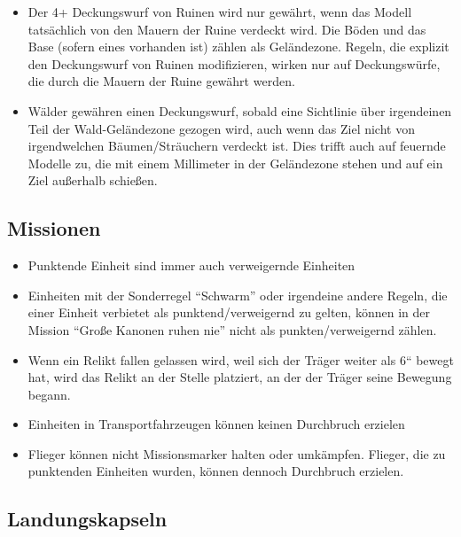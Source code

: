 \begin{itemize}

 \item Der 4+ Deckungswurf von Ruinen wird nur gewährt, wenn das Modell
  tatsächlich von den Mauern der Ruine verdeckt wird. Die Böden und das Base
  (sofern eines vorhanden ist) zählen als Geländezone.
Regeln, die explizit den Deckungswurf von Ruinen modifizieren, wirken nur auf
Deckungswürfe, die durch die Mauern der Ruine gewährt werden.

\item Wälder gewähren einen Deckungswurf, sobald eine Sichtlinie über
 irgendeinen Teil der Wald-Geländezone gezogen wird, auch wenn das Ziel nicht
 von irgendwelchen Bäumen/Sträuchern verdeckt ist.
Dies trifft auch auf feuernde Modelle zu, die mit einem Millimeter in der
Geländezone stehen und auf ein Ziel außerhalb schießen.

\end{itemize}

\subsection{Missionen}

\begin{itemize}

 \item Punktende Einheit sind immer auch verweigernde Einheiten

 \item Einheiten mit der Sonderregel ``Schwarm'' oder irgendeine andere Regeln,
  die einer Einheit  verbietet als punktend/verweigernd zu gelten, können in der
  Mission ``Große Kanonen ruhen nie'' nicht als punkten/verweigernd zählen.

 \item Wenn ein Relikt fallen gelassen wird, weil sich der Träger weiter als 6“
  bewegt hat, wird das Relikt an der Stelle platziert, an der der Träger seine
  Bewegung begann.

 \item Einheiten in Transportfahrzeugen können keinen Durchbruch erzielen

 \item Flieger können nicht Missionsmarker halten oder umkämpfen. Flieger, die
  zu punktenden Einheiten wurden, können dennoch Durchbruch erzielen.

\end{itemize}

\subsection{Landungskapseln}

